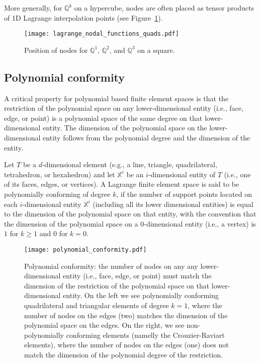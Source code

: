 More generally, for $\mathbb{Q}^k$ on a hypercube, nodes are often placed as tensor products of 1D Lagrange interpolation points (see Figure~\ref{fig:q_nodes_2d}).


\begin{figure}[!htb]
  \centering
  \texttt{[image: lagrange\_nodal\_functions\_quads.pdf]}
  \caption{Position of nodes for $\mathbb{Q}^1$, $\mathbb{Q}^2$, and $\mathbb{Q}^3$ on a square.}
  \label{fig:q_nodes_2d}
  \end{figure}

\subsection{Polynomial conformity}

A critical property for polynomial based finite element spaces is that the restriction of the polynomial space on any lower-dimensional entity (i.e., face, edge, or point) is a polynomial space of the same degree on that lower-dimensional entity. The dimension of the polynomial space on the lower-dimensional entity follows from the polynomial degree and the dimension of the entity.

\begin{definition} 
Let $T$ be a $d$-dimensional element (e.g., a line, triangle, quadrilateral, tetrahedron, or hexahedron) and let $\mathbb{X}^i$ be an $i$-dimensional entity of $T$ (i.e., one of its faces, edges, or vertices). A Lagrange finite element space is said to be polynomially conforming of degree $k$, if the number of support points located on each $i$-dimensional entity $\mathbb{X}^i$ (including all its lower dimensional entities) is equal to the dimension of the polynomial space on that entity, with the convention that the dimension of the polynomial space on a $0$-dimensional entity (i.e., a vertex) is $1$ for $k \geq 1$ and $0$ for $k=0$.
\label{def:polynomial_conformity}
\end{definition}

\begin{figure}
\centering
\texttt{[image: polynomial\_conformity.pdf]}
\caption{Polynomial conformity: the number of nodes on any any lower-dimensional entity (i.e., face, edge, or point) must match the dimension of the restriction of the polynomial space on that lower-dimensional entity. On the left we see polynomially conforming quadrilateral and triangular elements of degree $k=1$, where the number of nodes on the edges (two) matches the dimension of the polynomial space on the edges. On the right, we see non-polynomially conforming elements (namelly the Crouzier-Raviart elements), where the number of nodes on the edges (one) does not match the dimension of the polynomial degree of the restriction.}
\label{fig:polynomial_conformity}
\end{figure}

